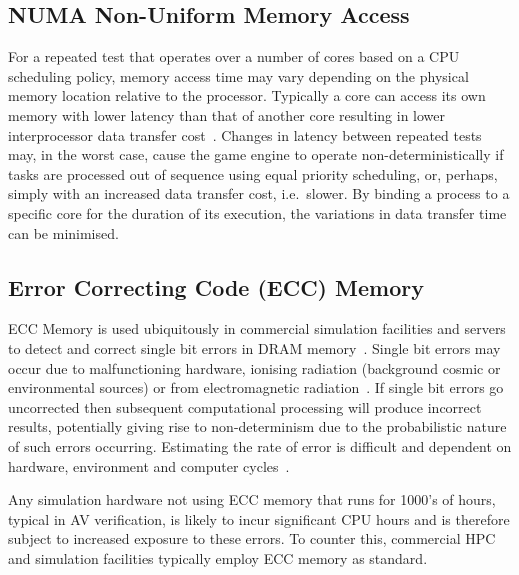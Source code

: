 \documentclass[letterpaper, 10 pt, journal, twoside]{IEEEtran}
\begin{document}
\subsection{NUMA Non-Uniform Memory Access}
For a repeated test that operates over a number of cores based on a CPU scheduling policy, memory access time may vary depending on the physical memory location relative to the processor. Typically a core can access its own memory with lower latency than that of another core resulting in lower interprocessor data transfer cost~\cite{nieplocha1996global}. 
%
Changes in latency between repeated tests may, in the worst case, cause the game engine to operate non-deterministically if tasks are processed out of sequence using equal priority scheduling, or, perhaps, simply with an increased data transfer cost, i.e.\ slower. 
%
By binding a process to a specific core for the duration of its execution, the variations in data transfer time can be minimised.


\subsection{Error Correcting Code (ECC) Memory}
ECC Memory is used ubiquitously in commercial simulation facilities and servers to detect and correct single bit errors in DRAM memory~\cite{Dell1997}. Single bit errors may occur due to malfunctioning hardware, ionising radiation (background cosmic or environmental sources) or from electromagnetic radiation~\cite{dodd2003basic}. If single bit errors go uncorrected then subsequent computational processing will produce incorrect results, potentially giving rise to non-determinism due to the probabilistic nature of such errors occurring. Estimating the rate of error is difficult and dependent on hardware, environment and computer cycles~\cite{mielke2008bit}.

Any simulation hardware not using ECC memory that runs for 1000's of hours, typical in AV verification, is likely to incur significant CPU hours and is therefore subject to increased exposure to these errors. To counter this, commercial HPC and simulation facilities typically employ ECC memory as standard.

\end{document}
